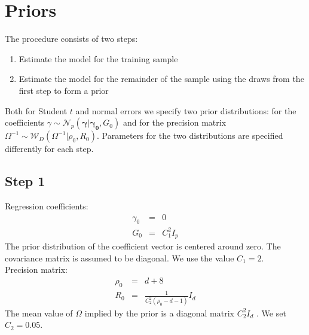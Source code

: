 \documentclass[12pt]{article}
\begin{document}
\section{Priors}

The procedure consists of two steps:
\begin{enumerate}
	\item Estimate the model for the training sample
	\item Estimate the model for the remainder of the sample using the draws from the first step to form a prior
\end{enumerate}
Both for Student $t$ and normal errors we specify two prior distributions: for the coefficients $\gamma \sim \mathcal{N}_{p}\left( \boldsymbol{\gamma} |\boldsymbol{\gamma_{0}},G_{0}\right)$ and for the precision matrix $\Omega^{-1} \sim \mathcal{W}_{D}  \left(\Omega ^{-1}|\rho_{0}, R_{0}\right) $. Parameters for the two distributions are specified differently for each step.


\subsection{Step 1}
Regression coefficients:
\begin{eqnarray*}
	\gamma_{0} &=& 0 \\ 
	G_{0} &=& C_{1}^{2}I_{p} 
\end{eqnarray*}
The prior distribution of the coefficient vector is centered around zero. The covariance matrix is assumed to be diagonal. We use the value $C_{1} = 2$. \\
Precision matrix:
\begin{eqnarray*}
	\rho_{0} &=& d + 8 \\ 
	R_{0} &=& \frac{1}{C_{2}^{2} (\rho_{0}-d-1)}I_{d}
\end{eqnarray*}
The mean value of $\Omega$ implied by the prior is a diagonal matrix $C_{2}^{2}I_{d}$ . We set $C_{2} = 0.05$.\\
\end{document}
